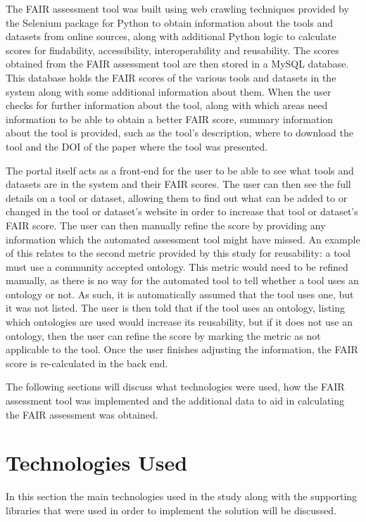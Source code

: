 \documentclass{cisfyp}
\begin{document}
The FAIR assessment tool was built using web crawling techniques provided by the Selenium package for Python to obtain information about the tools and datasets from online sources, along with additional Python logic to calculate scores for findability, accessibility, interoperability and reusability. The scores obtained from the FAIR assessment tool are then stored in a MySQL database. This database holds the FAIR scores of the various tools and datasets in the system along with some additional information about them. When the user checks for further information about the tool, along with which areas need information to be able to obtain a better FAIR score, summary information about the tool is provided, such as the tool's description, where to download the tool and the DOI of the paper where the tool was presented.

The portal itself acts as a front-end for the user to be able to see what tools and datasets are in the system and their FAIR scores. The user can then see the full details on a tool or dataset, allowing them to find out what can be added to or changed in the tool or dataset's website in order to increase that tool or dataset's FAIR score. The user can then manually refine the score by providing any information which the automated assessment tool might have missed. An example of this relates to the second metric provided by this study for reusability: a tool must use a community accepted ontology. This metric would need to be refined manually, as there is no way for the automated tool to tell whether a tool uses an ontology or not. As such, it is automatically assumed that the tool uses one, but it was not listed. The user is then told that if the tool uses an ontology, listing which ontologies are used would increase its reusability, but if it does not use an ontology, then the user can refine the score by marking the metric as not applicable to the tool. Once the user finishes adjusting the information, the FAIR score is re-calculated in the back end. 

The following sections will discuss what technologies were used, how the FAIR assessment tool was implemented and the additional data to aid in calculating the FAIR assessment was obtained.
\section{Technologies Used}
In this section the main technologies used in the study along with the supporting libraries that were used in order to implement the solution will be discussed.
\end{document}
